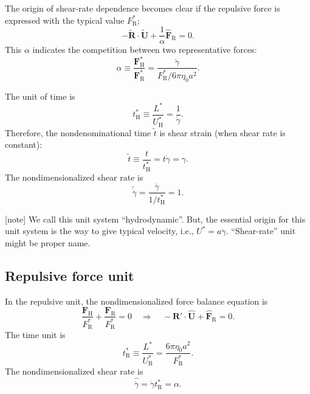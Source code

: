 \documentclass[fontsize=11pt]{scrartcl}
\begin{document}
The origin of shear-rate dependence
becomes clear if the repulsive force
is expressed with the typical value $F_{\mathrm{R}}^{\ast}$;
%
\begin{equation}
 - \tilde{\bm{R}} \cdot \tilde{\bm{U}} +
\frac{1}{\alpha}  \hat{\bm{F}}_{\mathrm{R}} = 0.
\end{equation}
%
This $\alpha$ indicates the competition between two representative forces:
\begin{equation}
 \alpha \equiv
\frac{\bm{F}_{\mathrm{H}}^{\ast}}{\bm{F}_{\mathrm{R}}^{\ast}}
=
  \frac{\dot{\gamma}}{F_{\mathrm{R}}^{\ast}/6\pi\eta_0 a^2}\label{102734_31May15}.
\end{equation}


The unit of time is
\begin{equation}
 t_{\mathrm{H}}^{\ast} \equiv \frac{L^{\ast}}{U_{\mathrm{H}}^{\ast}}
  = \frac{1}{\dot{\gamma}}.
\end{equation}
Therefore, the nondenominational time $\tilde{t}$
is shear strain (when shear rate is constant):
\begin{equation} 
 \tilde{t} \equiv \frac{t}{t_{\mathrm{H}}^{\ast}} = t \dot{\gamma}
   = \gamma.
\end{equation}
%
The nondimensionalized shear rate is
\begin{equation}
 \tilde{\dot{\gamma}}
  =
  \frac{ \dot{\gamma}}{1/t_{\mathrm{H}}^{\ast}}
   = 1.
\end{equation}


[note]
We call this unit system ``hydrodynamic''.
But, the essential origin for this unit system
is the way to give typical velocity,
i.e., $U^{\ast} = a \dot{\gamma}$.
%
``Shear-rate'' unit might be proper name.


\subsection*{Repulsive force unit}

In the repulsive unit,
the nondimensionalized
force balance equation is
\begin{equation}
 \frac{\bm{F}_{\mathrm{H}}}{F^{\ast}_{\mathrm{R}}}
  +
  \frac{\bm{F}_{\mathrm{R}}}{F^{\ast}_{\mathrm{R}}}  = 0
      \quad
  \Longrightarrow
    \quad
    - \bm{R}' \cdot \hat{\bm{U}} +
    \hat{\bm{F}}_{\mathrm{R}} = 0.
\end{equation}
The time unit is
\begin{equation}
 t_{\mathrm{R}}^{\ast}
  \equiv \frac{L^{\ast}}{U_{\mathrm{R}}^{\ast}}
  = \frac{6 \pi \eta_0 a^2}{F_{\mathrm{R}}^{\ast}}.
\end{equation}
%
The nondimensionalized shear rate is
\begin{equation}
 \hat{\dot{\gamma}} =
  \dot{\gamma} t_{\mathrm{R}}^{\ast}
  = \alpha.
\end{equation}
\end{document}

